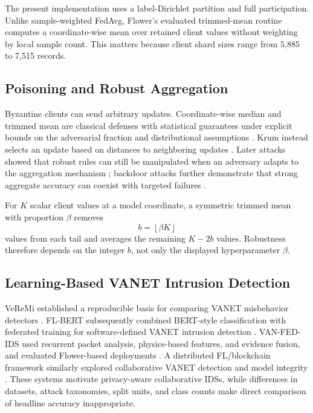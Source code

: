 \documentclass[journal]{IEEEtran}
\begin{document}
The present implementation uses a label-Dirichlet partition and full participation. Unlike sample-weighted FedAvg, Flower's evaluated trimmed-mean routine computes a coordinate-wise mean over retained client values without weighting by local sample count. This matters because client shard sizes range from 5,885 to 7,515 records.

\subsection{Poisoning and Robust Aggregation}
Byzantine clients can send arbitrary updates. Coordinate-wise median and trimmed mean are classical defenses with statistical guarantees under explicit bounds on the adversarial fraction and distributional assumptions \cite{yin2018byzantine}. Krum instead selects an update based on distances to neighboring updates \cite{blanchard2017machine}. Later attacks showed that robust rules can still be manipulated when an adversary adapts to the aggregation mechanism \cite{fang2020local}; backdoor attacks further demonstrate that strong aggregate accuracy can coexist with targeted failures \cite{bagdasaryan2020backdoor}.

For $K$ scalar client values at a model coordinate, a symmetric trimmed mean with proportion $\beta$ removes
\begin{equation}
    b=\left\lfloor \beta K \right\rfloor
    \label{eq:trim-count}
\end{equation}
values from each tail and averages the remaining $K-2b$ values. Robustness therefore depends on the integer $b$, not only the displayed hyperparameter $\beta$.

\subsection{Learning-Based VANET Intrusion Detection}
VeReMi established a reproducible basis for comparing VANET misbehavior detectors \cite{vanderheijden2018veremi}. FL-BERT subsequently combined BERT-style classification with federated training for software-defined VANET intrusion detection \cite{ahsan2024privacy}. VAN-FED-IDS used recurrent packet analysis, physics-based features, and evidence fusion, and evaluated Flower-based deployments \cite{chen2024fast}. A distributed FL/blockchain framework similarly explored collaborative VANET detection and model integrity \cite{mansouri2025distributed}. These systems motivate privacy-aware collaborative IDSs, while differences in datasets, attack taxonomies, split units, and class counts make direct comparison of headline accuracy inappropriate.
\end{document}

